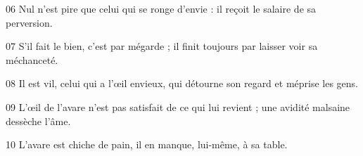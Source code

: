 
06 Nul n’est pire que celui qui se ronge d’envie : il reçoit le salaire de sa perversion.

07 S’il fait le bien, c’est par mégarde ; il finit toujours par laisser voir sa méchanceté.

08 Il est vil, celui qui a l’œil envieux, qui détourne son regard et méprise les gens.

09 L’œil de l’avare n’est pas satisfait de ce qui lui revient ; une avidité malsaine dessèche l’âme.

10 L’avare est chiche de pain, il en manque, lui-même, à sa table.

